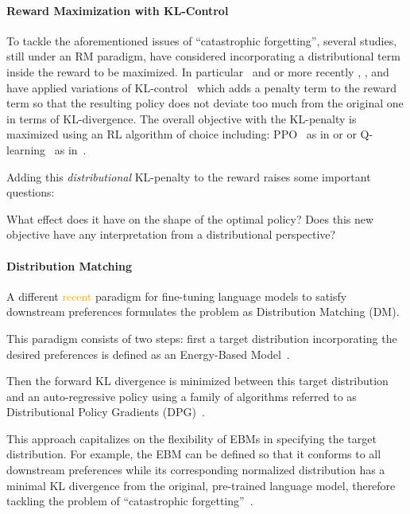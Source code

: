 \paragraph{Reward Maximization with KL-Control} To tackle the aforementioned issues of ``catastrophic forgetting'', several studies, still under an RM paradigm, have considered incorporating a distributional term inside the reward to be maximized. In particular~\citet{Jaques-2017,KL_jaquesK19} and \citet{Ziegler19} or more recently \citet{ziegler_summarize2021}, \citet{Ouyang}, \citet{bai2022training} and \citet{redteaming} have applied variations of KL-control~\citep{todorov,kappen2012optimal} which adds a penalty term to the reward term so that the resulting policy does not deviate too much from the original one in terms of KL-divergence. The overall objective with the KL-penalty is maximized using an RL algorithm of choice including: PPO~\citep{PPO} as in \cite{Ziegler19} or \cite{bai2022training} or Q-learning~\citep{MnihKSGAWR13} as in~\cite{Jaques-2017}.

Adding this \emph{distributional} KL-penalty to the reward raises some important questions:

What effect does it have on the shape of the optimal policy? Does this new objective have any interpretation from a distributional perspective?

\paragraph{Distribution Matching} A different \textcolor{orange}{recent} paradigm for fine-tuning language models to satisfy downstream preferences formulates the problem as Distribution Matching (DM).

This paradigm consists of two steps: first a target distribution incorporating the desired preferences is defined as an Energy-Based Model~\citep{lecun_tutorial_2006}.

Then the forward KL divergence is minimized between this target distribution and an auto-regressive policy using a family of algorithms referred to as Distributional Policy Gradients (DPG)~\citep{opt-rl-arxiv-2019,khalifa_2021,korbak2021code,pmlr-v162-korbak22a}. 

This approach capitalizes on the flexibility of EBMs in specifying the target distribution. For example, the EBM can be defined so that it conforms to all downstream preferences while its corresponding normalized distribution has a minimal KL divergence from the original, pre-trained language model, therefore tackling the problem of ``catastrophic forgetting''~\citep{khalifa_2021}.

